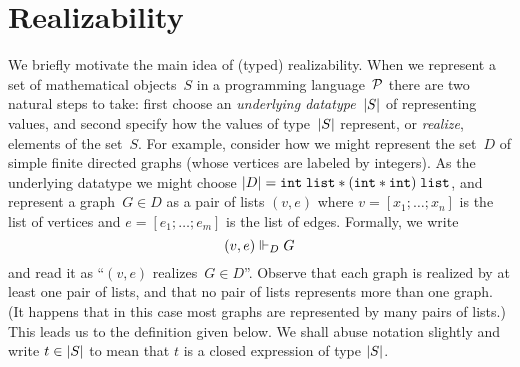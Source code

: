 
\section{Realizability}
\label{sec:realizability}

We briefly motivate the main idea of (typed) realizability. When we
represent a set of mathematical objects~$S$ in a programming
language~$\mathcal{P}$ there are two natural steps to take: first choose an
\emph{underlying datatype~$|S|$} of representing values, and second
specify how the values of type~$|S|$ represent, or \emph{realize},
elements of the set~$S$. For example, consider how we might represent
the set~$D$ of simple finite directed graphs (whose vertices are
labeled by integers). As the underlying datatype we might choose
$|D| = \mathtt{int} \; \mathtt{list} * (\mathtt{int} *
\mathtt{int}) \; \mathtt{list}$, and represent a graph~$G \in D$ as a
pair of lists $(v,e)$ where $v = [x_1; \ldots; x_n]$ is the list of
vertices and $e = [e_1; \ldots; e_m]$ is the list of edges. Formally,
we write
%
\begin{equation*}
  (v, e) \Vdash_D G
\end{equation*}
%
and read it as ``$(v,e)$ realizes~$G \in D$''. Observe that each graph
is realized by at least one pair of lists, and that no pair of lists
represents more than one graph. (It happens that in this case most graphs are
represented by many pairs of lists.) This leads us to the definition given
below. We shall abuse notation slightly and write $t \in |S|$ to
mean that $t$ is a closed expression of type $|S|$.


